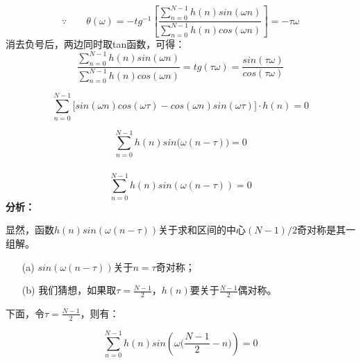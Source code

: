 \documentclass[notheorems,compress,mathserif,table]{beamer}
\begin{document}
\begin{frame}[allowframebreaks]\frametitle{}%
        $$\because\quad\quad
        \theta(\omega) = -tg^{-1}\left[\frac{
        \sum_{n=0}^{N-1}h(n)sin(\omega n)}{
        \sum_{n=0}^{N-1}h(n)cos(\omega n)}\right] = -\tau\omega$$
     消去负号后，两边同时取tan函数，可得：
        $$\frac{\sum_{n=0}^{N-1}h(n)sin(\omega n)}{\sum_{n=0}^{N-1}h(n)cos(\omega n)}
        = tg(\tau\omega) = \frac{sin(\tau\omega)}{cos(\tau\omega)}$$

        $$\sum_{n=0}^{N-1}\Big[sin(\omega n)cos(\omega\tau)-cos(\omega n)sin(\omega\tau)\Big]\cdot h(n) =0 $$

        $$\sum_{n=0}^{N-1}h(n)sin\big(\omega(n-\tau)\big)=0$$
\end{frame}



\begin{frame}[allowframebreaks]\frametitle{}%
  $$\sum_{n=0}^{N-1}h(n)sin(\omega(n-\tau))=0$$
\textbf{分析：}

显然，函数$h(n)sin(\omega(n-\tau))$关于求和区间的中心$(N-1)/2$奇对称是其一组解。
\begin{enumerate}
  \item [(a)] $sin(\omega(n-\tau))$关于$n=\tau$奇对称；
  \item [(b)] 我们猜想，如果取$\tau =\frac{N-1}{2}$，$h(n)$要关于$\frac{N-1}{2}$偶对称。
\end{enumerate}

\quad \newline\quad 
下面，令$\tau = \frac{N-1}{2}$，则有：

$$\sum_{n=0}^{N-1}h(n)sin\left(\omega\Big(\frac{N-1}{2}-n\Big)\right)=0$$
\end{frame}
\end{document}
